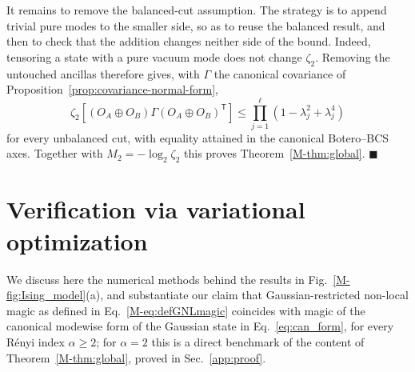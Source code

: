 \documentclass[aps,prl,twocolumn,superscriptaddress,reprint,longbibliography,nofootinbib]{revtex4-2}
\newcommand{\trans}{\mathsf{T}}
\newcommand{\RENYI}{\alpha}
\begin{document}
It remains to remove the balanced-cut assumption. The strategy is to append trivial pure modes to the smaller side, so as to reuse the balanced result, and then to check that the addition changes neither side of the bound. Indeed, tensoring a state with a pure vacuum mode does not change $\zeta_2$. Removing the untouched ancillas therefore gives, with $\Gamma$ the canonical covariance of Proposition~\ref{prop:covariance-normal-form},
\begin{equation}
    \zeta_2\!\left[(O_A\oplus O_B)\Gamma(O_A\oplus O_B)^{\trans}\right]\le\prod_{j=1}^{\ell}\left(1-\lambda_j^2+\lambda_j^4\right)
\end{equation}
for every unbalanced cut, with equality attained in the canonical Botero--BCS axes. Together with $M_2=-\log_2\zeta_2$ this proves Theorem~\ref{M-thm:global}. \hfill$\blacksquare$

\section{Verification via variational optimization}
\label{app:variational}

We discuss here the numerical methods behind the results in Fig.~\ref{M-fig:Ising_model}(a), and substantiate our claim that Gaussian-restricted non-local magic as defined in Eq.~\eqref{M-eq:defGNLmagic} coincides with magic of the canonical modewise form of the Gaussian state in Eq.~\eqref{eq:can_form}, for every R\'enyi index $\RENYI\ge2$; for $\RENYI=2$ this is a direct benchmark of the content of Theorem~\ref{M-thm:global}, proved in Sec.~\ref{app:proof}.
\end{document}
